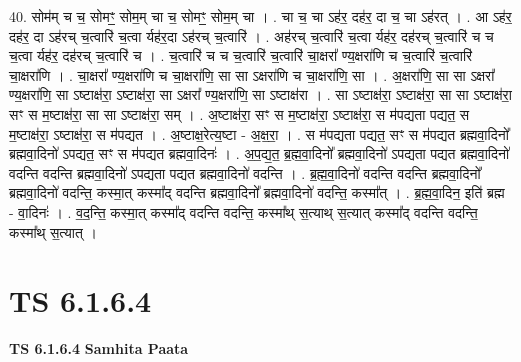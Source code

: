 \documentclass[17pt]{extarticle}
\begin{document}
40. सोम॑म् च च॒ सोमꣳ॒॒ सोम॒म् चा च॒ सोमꣳ॒॒ सोम॒म् चा । . चा च॒ चा ऽह॑र॒ दह॑र॒ दा च॒ चा ऽह॑रत् । . आ ऽह॑र॒ दह॑र॒ दा ऽह॑रच् च॒त्वारि॑ च॒त्वा र्यह॑र॒दा ऽह॑रच् च॒त्वारि॑ । . अह॑रच् च॒त्वारि॑ च॒त्वा र्यह॑र॒ दह॑रच् च॒त्वारि॑ च च च॒त्वा र्यह॑र॒ दह॑रच् च॒त्वारि॑ च । . च॒त्वारि॑ च च च॒त्वारि॑ च॒त्वारि॑ चा॒क्षरा᳚ ण्य॒क्षरा॑णि च च॒त्वारि॑ च॒त्वारि॑ चा॒क्षरा॑णि । . चा॒क्षरा᳚ ण्य॒क्षरा॑णि च चा॒क्षरा॑णि॒ सा सा ऽक्षरा॑णि च चा॒क्षरा॑णि॒ सा । . अ॒क्षरा॑णि॒ सा सा ऽक्षरा᳚ ण्य॒क्षरा॑णि॒ सा ऽष्टाक्ष॑रा॒ ऽष्टाक्ष॑रा॒ सा ऽक्षरा᳚ ण्य॒क्षरा॑णि॒ सा ऽष्टाक्ष॑रा । . सा ऽष्टाक्ष॑रा॒ ऽष्टाक्ष॑रा॒ सा सा ऽष्टाक्ष॑रा॒ सꣳ स म॒ष्टाक्ष॑रा॒ सा सा ऽष्टाक्ष॑रा॒ सम् । . अ॒ष्टाक्ष॑रा॒ सꣳ स म॒ष्टाक्ष॑रा॒ ऽष्टाक्ष॑रा॒ स म॑पद्यता पद्यत॒ स म॒ष्टाक्ष॑रा॒ ऽष्टाक्ष॑रा॒ स म॑पद्यत । . अ॒ष्टाक्ष॒रेत्य॒ष्टा - अ॒क्ष॒रा॒ । . स म॑पद्यता पद्यत॒ सꣳ स म॑पद्यत ब्रह्मवा॒दिनो᳚ ब्रह्मवा॒दिनो॑ ऽपद्यत॒ सꣳ स म॑पद्यत ब्रह्मवा॒दिनः॑ । . अ॒प॒द्य॒त॒ ब्र॒ह्म॒वा॒दिनो᳚ ब्रह्मवा॒दिनो॑ ऽपद्यता पद्यत ब्रह्मवा॒दिनो॑ वदन्ति वदन्ति ब्रह्मवा॒दिनो॑ ऽपद्यता पद्यत ब्रह्मवा॒दिनो॑ वदन्ति । . ब्र॒ह्म॒वा॒दिनो॑ वदन्ति वदन्ति ब्रह्मवा॒दिनो᳚ ब्रह्मवा॒दिनो॑ वदन्ति॒ कस्मा॒त् कस्मा᳚द् वदन्ति ब्रह्मवा॒दिनो᳚ ब्रह्मवा॒दिनो॑ वदन्ति॒ कस्मा᳚त् । . ब्र॒ह्म॒वा॒दिन॒ इति॑ ब्रह्म - वा॒दिनः॑ । . व॒द॒न्ति॒ कस्मा॒त् कस्मा᳚द् वदन्ति वदन्ति॒ कस्मा᳚थ् स॒त्याथ् स॒त्यात् कस्मा᳚द् वदन्ति वदन्ति॒ कस्मा᳚थ् स॒त्यात् । \newline
\pagebreak
{}

\section{ TS 6.1.6.4 }

\textbf{TS 6.1.6.4 } \newline
\textbf{Samhita Paata} \newline
\end{document}
